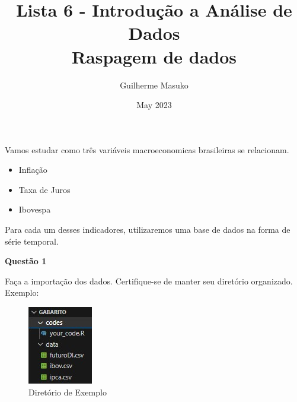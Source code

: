 \documentclass[12pt, a4paper]{article}
\title{Lista 6 - Introdução a Análise de Dados \\
	Raspagem de dados}
\author{Guilherme Masuko}
\date{May 2023}
\begin{document}
	
\clearpage
\maketitle
\thispagestyle{empty}

Vamos estudar como três variáveis macroeconomicas brasileiras se relacionam. 

\begin{itemize}
	\item Inflação
	\item Taxa de Juros
	\item Ibovespa
\end{itemize}

Para cada um desses indicadores, utilizaremos uma base de dados na forma de série temporal. 



\textbf{Questão 1}

Faça a importação dos dados. Certifique-se de manter seu diretório organizado. Exemplo:

\begin{figure}[H]
	\caption{Diretório de Exemplo}
	\centering
	\includegraphics[scale=1]{images/directory.jpg}
\end{figure}
\end{document}
